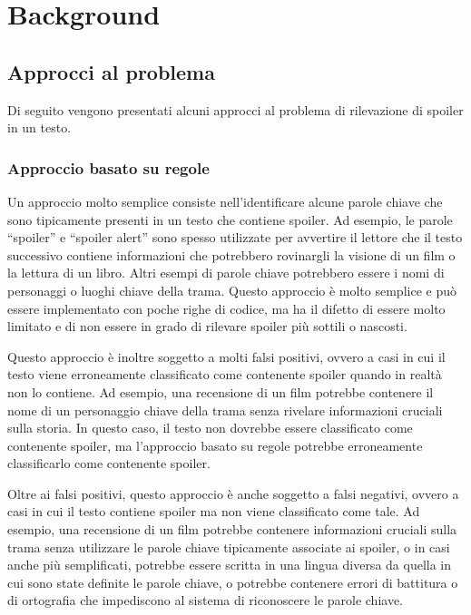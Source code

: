 \chapter{Background}
\label{ch:background}

\section{Approcci al problema}
\label{sec:approcci}

Di seguito vengono presentati alcuni approcci al problema
di rilevazione di spoiler in un testo.

\subsection{Approccio basato su regole}
\label{subsec:approccio-regole}

Un approccio molto semplice consiste nell'identificare
alcune parole chiave che sono tipicamente presenti in un
testo che contiene spoiler.
Ad esempio, le parole ``spoiler'' e ``spoiler alert'' sono
spesso utilizzate per avvertire il lettore che il testo
successivo contiene informazioni che potrebbero rovinargli
la visione di un film o la lettura di un libro.
Altri esempi di parole chiave potrebbero essere i nomi di
personaggi o luoghi chiave della trama.
Questo approccio è molto semplice e può essere implementato
con poche righe di codice, ma ha il difetto di essere molto
limitato e di non essere in grado di rilevare spoiler più
sottili o nascosti.

Questo approccio è inoltre soggetto a molti falsi positivi,
ovvero a casi in cui il testo viene erroneamente
classificato come contenente spoiler quando in realtà non
lo contiene.
Ad esempio, una recensione di un film potrebbe contenere il
nome di un personaggio chiave della trama senza rivelare
informazioni cruciali sulla storia.
In questo caso, il testo non dovrebbe essere classificato
come contenente spoiler, ma l'approccio basato su regole
potrebbe erroneamente classificarlo come contenente
spoiler.

Oltre ai falsi positivi, questo approccio è anche soggetto
a falsi negativi, ovvero a casi in cui il testo contiene
spoiler ma non viene classificato come tale.
Ad esempio, una recensione di un film potrebbe contenere
informazioni cruciali sulla trama senza utilizzare le
parole chiave tipicamente associate ai spoiler, o in casi
anche più semplificati, potrebbe essere scritta in una
lingua diversa da quella in cui sono state definite le
parole chiave, o potrebbe contenere errori di battitura o
di ortografia che impediscono al sistema di riconoscere le
parole chiave.

